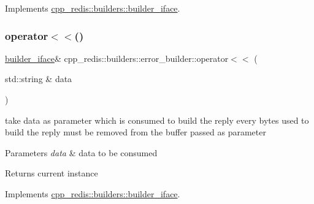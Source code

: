 Implements \hyperlink{classcpp__redis_1_1builders_1_1builder__iface_afd2ff2c2371c2a486116543b638b9413}{cpp\+\_\+redis\+::builders\+::builder\+\_\+iface}.

\mbox{\label{classcpp__redis_1_1builders_1_1error__builder_af5ac542be148d6f8500de79fa3164798}} 
\subsubsection{\texorpdfstring{operator$<$$<$()}{operator<<()}}
{\footnotesize\ttfamily \hyperlink{classcpp__redis_1_1builders_1_1builder__iface}{builder\+\_\+iface}\& cpp\+\_\+redis\+::builders\+::error\+\_\+builder\+::operator$<$$<$ (\begin{DoxyParamCaption}\item[{std\+::string \&}]{data }\end{DoxyParamCaption})\hspace{0.3cm}{\ttfamily [virtual]}}

take data as parameter which is consumed to build the reply every bytes used to build the reply must be removed from the buffer passed as parameter


\begin{DoxyParams}{Parameters}
{\em data} & data to be consumed \\
\hline
\end{DoxyParams}
\begin{DoxyReturn}{Returns}
current instance 
\end{DoxyReturn}


Implements \hyperlink{classcpp__redis_1_1builders_1_1builder__iface_a9892bbc9c887c31c2742dad4476e2fa6}{cpp\+\_\+redis\+::builders\+::builder\+\_\+iface}.

\mbox{\label{classcpp__redis_1_1builders_1_1error__builder_a0b1be51200ff84f17693ee888b03d505}} 
